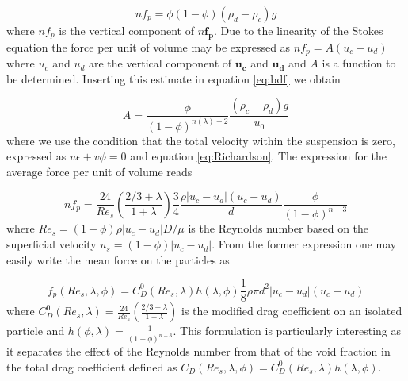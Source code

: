 \begin{equation}
nf_p = \phi(1-\phi)(\rho_d -\rho _c)g
\label{eq:bdf}
\end{equation}
where $nf_p$ is the vertical component of $n\mathbf{f_p}$. Due to the linearity of the Stokes equation the force per unit of volume may be expressed as $nf_p = A (u_c -u_d)$ where $u_c$ and $u_d$ are the vertical component of $\mathbf{u_c}$ and $\mathbf{u_d}$ and $A$ is a function to be determined. Inserting this estimate in equation \ref{eq:bdf} we obtain 

\begin{equation}
A = \frac{\phi}{(1-\phi)^{n(\lambda)-2}} \frac{(\rho_c -\rho_d)g}{u_0} 
\end{equation}
where we use the condition that the total velocity within the suspension is zero, expressed as $u\epsilon + v\phi=0$ and equation \ref{eq:Richardson}. The expression for the average force per unit of volume reads %



\begin{equation}
nf_p = \frac{24}{Re_s}\left(\frac{2/3+\lambda}{1+\lambda}\right)\frac{3}{4}\frac{\rho |u_c-u_d|(u_c-u_d)}{d}\frac{\phi}{(1-\phi)^{n-3}}
\end{equation}
where $Re_s = (1-\phi)\rho |u_c-u_d| D/\mu$ is the Reynolds number based on the superficial velocity $u_s=(1-\phi) |u_c-u_d|$. From the former expression one may easily write the mean force on the particles as

\begin{equation}
f_p (Re_s,\lambda,\phi) = C_D^0(Re_s,\lambda)h(\lambda,\phi)\frac{1}{8}\rho \pi d^2 |u_c-u_d|(u_c-u_d)
\end{equation}
where $C_D^0(Re_s,\lambda)=\frac{24}{Re_s}\left(\frac{2/3+\lambda}{1+\lambda}\right)$ is the modified drag coefficient on an isolated particle and $h(\phi,\lambda) =\frac{1}{(1-\phi)^{n-3}}$. This formulation is particularly interesting as it separates the effect of the Reynolds number from that of the void fraction in the total drag coefficient defined as $C_D(Re_s,\lambda,\phi) = C_D^0(Re_s,\lambda)h(\lambda,\phi)$. 

